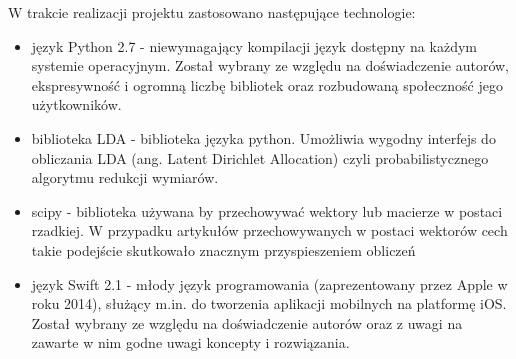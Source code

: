 W trakcie realizacji projektu zastosowano następujące technologie:
\begin{itemize}
  \item język Python 2.7 - niewymagający kompilacji język dostępny na każdym systemie operacyjnym. Został wybrany ze względu na doświadczenie autorów, ekspresywność i ogromną liczbę bibliotek oraz rozbudowaną społeczność jego użytkowników.
 \item biblioteka LDA - biblioteka języka python. Umożliwia wygodny interfejs do obliczania LDA (ang. Latent Dirichlet Allocation) czyli probabilistycznego algorytmu redukcji wymiarów.
 \item scipy - biblioteka używana by przechowywać wektory lub macierze w postaci rzadkiej. W przypadku artykułów przechowywanych w postaci wektorów cech takie podejście skutkowało znacznym przyspieszeniem obliczeń
 \item język Swift 2.1 - młody język programowania (zaprezentowany przez Apple w roku 2014), służący m.in. do tworzenia aplikacji mobilnych na platformę iOS. Został wybrany ze względu 
na doświadczenie autorów oraz z uwagi na zawarte 
w nim godne uwagi koncepty i rozwiązania. 
\end{itemize}